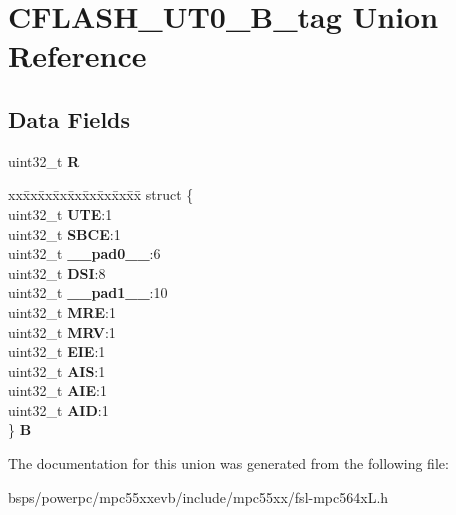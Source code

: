 \hypertarget{unionCFLASH__UT0__32B__tag}{}\section{C\+F\+L\+A\+S\+H\+\_\+\+U\+T0\+\_\+B\+\_\+tag Union Reference}
\label{unionCFLASH__UT0__32B__tag}
\subsection*{Data Fields}
\begin{DoxyCompactItemize}
\item 
\mbox{\label{unionCFLASH__UT0__32B__tag_ab85feaab19417fda8af7ff830e3e7de8}} 
uint32\+\_\+t {\bfseries R}
\item 
\mbox{\label{unionCFLASH__UT0__32B__tag_a6d7f11b1def503bce7c5058a149af686}} 
\begin{tabbing}
xx\=xx\=xx\=xx\=xx\=xx\=xx\=xx\=xx\=\kill
struct \{\\
\>uint32\_t {\bfseries UTE}:1\\
\>uint32\_t {\bfseries SBCE}:1\\
\>uint32\_t {\bfseries \_\_pad0\_\_}:6\\
\>uint32\_t {\bfseries DSI}:8\\
\>uint32\_t {\bfseries \_\_pad1\_\_}:10\\
\>uint32\_t {\bfseries MRE}:1\\
\>uint32\_t {\bfseries MRV}:1\\
\>uint32\_t {\bfseries EIE}:1\\
\>uint32\_t {\bfseries AIS}:1\\
\>uint32\_t {\bfseries AIE}:1\\
\>uint32\_t {\bfseries AID}:1\\
\} {\bfseries B}\\

\end{tabbing}\end{DoxyCompactItemize}


The documentation for this union was generated from the following file\+:\begin{DoxyCompactItemize}
\item 
bsps/powerpc/mpc55xxevb/include/mpc55xx/fsl-\/mpc564x\+L.\+h\end{DoxyCompactItemize}
